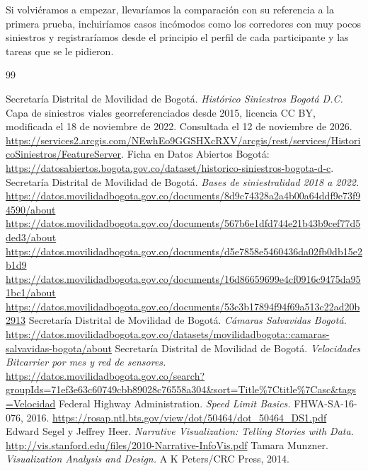 \documentclass[10pt,a4paper]{article}
\begin{document}
Si volviéramos a empezar, llevaríamos la comparación con su referencia a la primera prueba, incluiríamos casos incómodos como los corredores con muy pocos siniestros y registraríamos desde el principio el perfil de cada participante y las tareas que se le pidieron.

\bigskip
{}
{}
\begin{thebibliography}{99}
\raggedright
{} Secretaría Distrital de Movilidad de Bogotá. \textit{Histórico Siniestros Bogotá D.C.} Capa de siniestros viales georreferenciados desde 2015, licencia CC BY, modificada el 18 de noviembre de 2022. Consultada el 12 de noviembre de 2026. \url{https://services2.arcgis.com/NEwhEo9GGSHXcRXV/arcgis/rest/services/HistoricoSiniestros/FeatureServer}. Ficha en Datos Abiertos Bogotá: \url{https://datosabiertos.bogota.gov.co/dataset/historico-siniestros-bogota-d-c}.
 Secretaría Distrital de Movilidad de Bogotá. \textit{Bases de siniestralidad 2018 a 2022.} \url{https://datos.movilidadbogota.gov.co/documents/8d9c74328a2a4b00a64ddf9e73f94590/about} \url{https://datos.movilidadbogota.gov.co/documents/567b6e1dfd744e21b43b9cef77d5ded3/about} \url{https://datos.movilidadbogota.gov.co/documents/d5e7858e5460436da02fb0db15e2b1d9} \url{https://datos.movilidadbogota.gov.co/documents/16d86659699e4cf0916c9475da951bc1/about} \url{https://datos.movilidadbogota.gov.co/documents/53c3b17894f94f69a513c22ad20b2913}
 Secretaría Distrital de Movilidad de Bogotá. \textit{Cámaras Salvavidas Bogotá.} \url{https://datos.movilidadbogota.gov.co/datasets/movilidadbogota::camaras-salvavidas-bogota/about}
 Secretaría Distrital de Movilidad de Bogotá. \textit{Velocidades Bitcarrier por mes y red de sensores.} \url{https://datos.movilidadbogota.gov.co/search?groupIds=71ef3e63c60749cbb89028c76558a304&sort=Title%7Ctitle%7Casc&tags=Velocidad}
 Federal Highway Administration. \textit{Speed Limit Basics.} FHWA-SA-16-076, 2016. \url{https://rosap.ntl.bts.gov/view/dot/50464/dot_50464_DS1.pdf}
 Edward Segel y Jeffrey Heer. \textit{Narrative Visualization: Telling Stories with Data.} \url{http://vis.stanford.edu/files/2010-Narrative-InfoVis.pdf}
 Tamara Munzner. \textit{Visualization Analysis and Design.} A K Peters/CRC Press, 2014.
\end{thebibliography}
\end{document}
